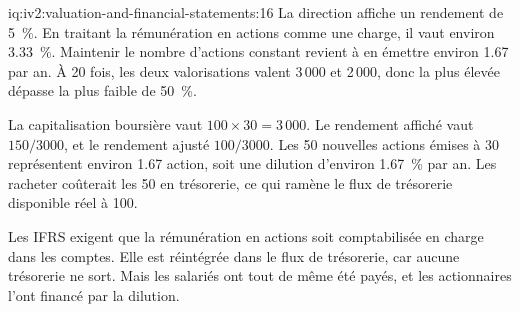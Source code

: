 \begin{solution}{iq:iv2:valuation-and-financial-statements:16}
La direction affiche un rendement de 5~\%. En traitant la rémunération en actions comme une charge, il vaut environ 3.33~\%. Maintenir le nombre d'actions constant revient à en émettre environ 1.67 par an. À 20 fois, les deux valorisations valent 3\,000 et 2\,000, donc la plus élevée dépasse la plus faible de 50~\%.

La capitalisation boursière vaut $100 \times 30 = 3\,000$. Le rendement affiché vaut $150/3000$, et le rendement ajusté $100/3000$. Les 50 nouvelles actions émises à 30 représentent environ 1.67 action, soit une dilution d'environ 1.67~\% par an. Les racheter coûterait les 50 en trésorerie, ce qui ramène le flux de trésorerie disponible réel à 100.

Les IFRS exigent que la rémunération en actions soit comptabilisée en charge dans les comptes. Elle est réintégrée dans le flux de trésorerie, car aucune trésorerie ne sort. Mais les salariés ont tout de même été payés, et les actionnaires l'ont financé par la dilution.

\end{solution}

